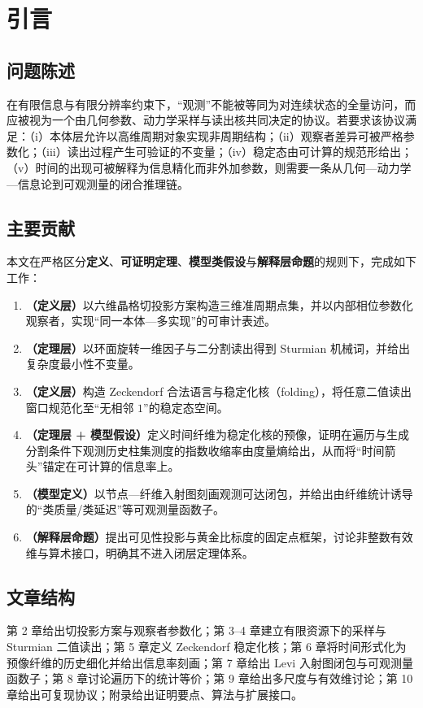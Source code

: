 \section{引言}

\subsection{问题陈述}

在有限信息与有限分辨率约束下，“观测”不能被等同为对连续状态的全量访问，而应被视为一个由几何参数、动力学采样与读出核共同决定的协议。若要求该协议满足：（i）本体层允许以高维周期对象实现非周期结构；（ii）观察者差异可被严格参数化；（iii）读出过程产生可验证的不变量；（iv）稳定态由可计算的规范形给出；（v）时间的出现可被解释为信息精化而非外加参数，则需要一条从几何—动力学—信息论到可观测量的闭合推理链。

\subsection{主要贡献}

本文在严格区分\textbf{定义}、\textbf{可证明定理}、\textbf{模型类假设}与\textbf{解释层命题}的规则下，完成如下工作：
\begin{enumerate}
  \item \textbf{（定义层）}以六维晶格切投影方案构造三维准周期点集，并以内部相位参数化观察者，实现“同一本体—多实现”的可审计表述。
  \item \textbf{（定理层）}以环面旋转一维因子与二分割读出得到 Sturmian 机械词，并给出复杂度最小性不变量。
  \item \textbf{（定义层）}构造 Zeckendorf 合法语言与稳定化核（folding），将任意二值读出窗口规范化至“无相邻 $1$”的稳定态空间。
  \item \textbf{（定理层 + 模型假设）}定义时间纤维为稳定化核的预像，证明在遍历与生成分割条件下观测历史柱集测度的指数收缩率由度量熵给出，从而将“时间箭头”锚定在可计算的信息率上。
  \item \textbf{（模型定义）}以节点—纤维入射图刻画观测可达闭包，并给出由纤维统计诱导的“类质量/类延迟”等可观测量函数子。
  \item \textbf{（解释层命题）}提出可见性投影与黄金比标度的固定点框架，讨论非整数有效维与算术接口，明确其不进入闭层定理体系。
\end{enumerate}

\subsection{文章结构}

第 2 章给出切投影方案与观察者参数化；第 3--4 章建立有限资源下的采样与 Sturmian 二值读出；第 5 章定义 Zeckendorf 稳定化核；第 6 章将时间形式化为预像纤维的历史细化并给出信息率刻画；第 7 章给出 Levi 入射图闭包与可观测量函数子；第 8 章讨论遍历下的统计等价；第 9 章给出多尺度与有效维讨论；第 10 章给出可复现协议；附录给出证明要点、算法与扩展接口。

